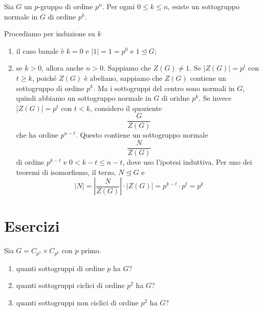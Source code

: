 \documentclass[a4paper]{article}
\begin{document}

\begin{snippettheorem}{}
    Sia \(G\) un \(p\)-gruppo di ordine \(p^n\).
    Per ogmi \(0 \leq k \leq n\), esiste un sottogruppo normale
    in \(G\) di ordine \(p^k\).
\end{snippettheorem}

\begin{snippetproof}{}
    Procediamo per induzione su \(k\)
    \begin{enumerate}
        \item il caso banale è \(k=0\) e \(|1| = 1 = p^0\) e \(1\unlhd G\);
        \item se \(k>0\), allora anche \(n>0\). Sappiamo che \(Z(G) \neq 1\).
        Se \(|Z(G)| = p^t\) con \(t\geq k\), poiché \(Z(G)\) è abeliano,
        sappiamo che \(Z(G)\) contiene un sottogruppo di ordine \(p^k\).
        Ma i sottogruppi del centro sono normali in \(G\), quindi abbiamo un sottogruppo
        normale in \(G\) di oridne \(p^k\).
        Se invece \(|Z(G)| = p^t\) con \(t<k\), considero il quoziente
        \[
            \frac{G}{Z(G)}
        \]
        che ha ordine \(p^{n-t}\).
        Questo contiene un sottogruppo normale
        \[
            \frac{N}{Z(G)}
        \]
        di ordine \(p^{k-t}\) e \(0 < k -t \leq n-t\), dove uso l'ipotesi induttiva.
        Per uno dei teoremi di isomorfismo, il terzo,
        \(N \unlhd G\) e
        \[
            |N| = \left|\frac{N}{Z(G)}\right| \cdot
            |Z(G)| = p^{k-t} \cdot p^t = p^k
        \]
    \end{enumerate}
\end{snippetproof}

\pagebreak

\section{Esercizi}

\begin{snippetexercise}{}
    Sia \(G = C_{p^3} \times C_{p^2}\) con \(p\) primo.
    \begin{enumerate}
        \item quanti sottogruppi di ordine \(p\) ha \(G\)?
        \item quanti sottogruppi ciclici di ordine \(p^2\) ha \(G\)?
        \item quanti sottogruppi non ciclici di ordine \(p^2\) ha \(G\)?
    \end{enumerate}
\end{snippetexercise}
\end{document}
